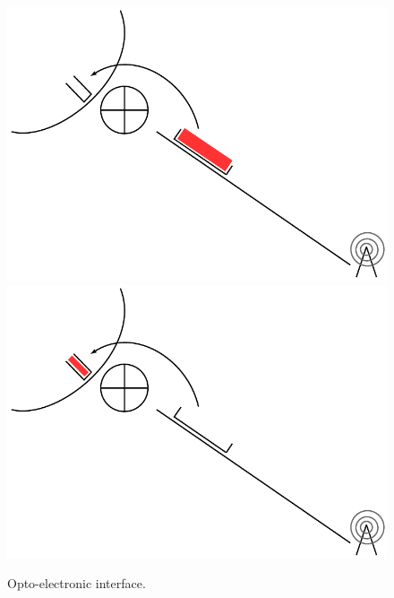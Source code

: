 \documentclass[]{algotel}
\begin{document}
\begin{figure}[h!]
\begin{center}   

      \includegraphics[scale=0.3]{slot1.pdf}
  \includegraphics[scale=0.3]{slot2.pdf}
     \caption{Opto-electronic interface.}
     
\end{center}
  \end{figure}
  
\end{document}
